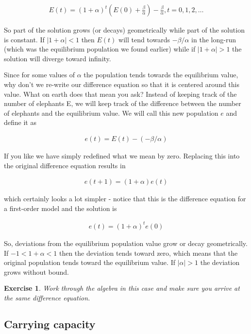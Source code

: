 \documentclass{tufte-handout}
\newtheorem{del}{Exercise}
\begin{document}
\begin{eqnarray*}
E(t) = (1 + \alpha)^t (E(0) + \frac{\beta}{\alpha}) - \frac{\beta}{\alpha}, t=0,1,2,\ldots
\end{eqnarray*}

So part of the solution grows (or decays) geometrically while part of the solution is constant. If $|1 + \alpha| < 1$ then $E(t)$ will tend towards $-\beta/\alpha$ in the long-run (which was the equilibrium population we found earlier) while if $|1 + \alpha| > 1$ the solution will diverge toward infinity. 

Since for some values of $\alpha$ the population tends towards the equilibrium value, why don't we re-write our difference equation so that it is centered around this value. What on earth does that mean you ask? Instead of keeping track of the number of elephants E, we will keep track of the difference between the number of elephants and the equilibrium value. We will call this new population $e$ and define it as

\begin{eqnarray*}
e(t) = E(t)-(-\beta/\alpha)
\end{eqnarray*}

If you like we have simply redefined what we mean by zero. Replacing this into the original difference equation results in

\begin{eqnarray*}
e(t+1) = (1 + \alpha) e(t)
\end{eqnarray*}

which certainly looks a lot simpler - notice that this is the difference equation for a first-order model and the solution is

\begin{eqnarray*}
e(t) = (1 + \alpha)^t e(0)
\end{eqnarray*}

So, deviations from the equilibrium population value grow or decay geometrically. If $-1 <1+ \alpha < 1$ then the deviation tends toward zero, which means that the original population tends toward the equilibrium value. If $|\alpha| > 1$ the deviation grows without bound.  

\begin{del}
Work through the algebra in this case and make sure you arrive at the same difference equation.
\end{del}

\subsection{Carrying capacity}
\end{document}
